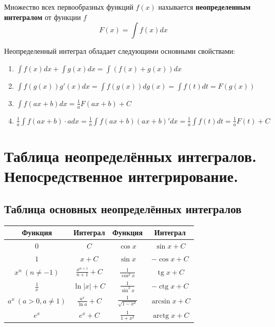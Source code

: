 \documentclass[14pt]{extreport}
\begin{document}
    \begin{definition}
        Множество всех первообразных функций $f(x)$ нахывается \textbf{неопределенным интегралом} от функции $f$
        $$
        F(x) = \int f(x)dx
        $$
    \end{definition}
    \newpage
    \begin{theorem}
        Неопределенный интеграл обладает следующими основными свойствами:
        \begin{enumerate}
            \item $\int f(x)dx + \int g(x)dx = \int (f(x) + g(x)) dx$
            \item $\int f(g(x)) g'(x) dx = \int f(g(x)) dg(x) = \int f(t) dt = F(g(x))$
            \item $\int f(ax+b) dx = \frac{1}{a} F(ax+b)+C$
            \item $\frac{1}{a}\int f(ax+b) \cdot a dx=\frac{1}{a} \int f(ax+b)(ax+b)'dx=\frac{1}{a}\int f(t) dt = \frac{1}{a}F(t)+C$
        \end{enumerate}
    \end{theorem}

    \chapter{Таблица неопределённых интегралов. Непосредственное интегрирование.}
    \section{Таблица основных неопределённых интегралов}

    \begin{center}
        \renewcommand{\arraystretch}{1.5}
        \begin{tabular}{|c|c|||c|c|}
        \hline
        \textbf{Функция} & \textbf{Интеграл} & \textbf{Функция} & \textbf{Интеграл} \\
        \hline
        $0$ & $C$ & $\cos x$ & $\sin x + C$ \\
        \hline
        $1$ & $x + C$ & $\sin x$ & $-\cos x + C$ \\
        \hline
        $x^n \ (n \neq -1)$ & $\frac{x^{n+1}}{n+1} + C$ & $\frac{1}{\cos^2 x}$ & $\operatorname{tg} x + C$ \\
        \hline
        $\frac{1}{x}$ & $\ln|x| + C$ & $\frac{1}{\sin^2 x}$ & $-\operatorname{ctg} x + C$ \\
        \hline
        $a^x \ (a>0, a\neq 1)$ & $\frac{a^x}{\ln a} + C$ & $\frac{1}{\sqrt{1-x^2}}$ & $\arcsin x + C$ \\
        \hline
        $e^x$ & $e^x + C$ & $\frac{1}{1+x^2}$ & $\operatorname{arctg} x + C$ \\
        \hline
        \end{tabular}
    \end{center}
\end{document}

